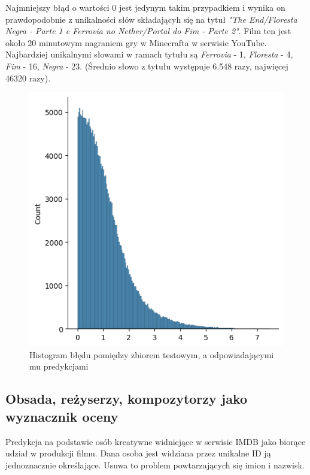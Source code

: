 \documentclass{article}
\begin{document}
{Najmniejszy błąd o wartości \( 0 \) jest jedynym takim przypadkiem i wynika on prawdopodobnie z unikalności słów składającyh się na tytuł \emph{"The End/Floresta Negra - Parte 1 e Ferrovia no Nether/Portal do Fim - Parte 2"}. Film ten jest około 20 minutowym nagraniem gry w Minecrafta w serwisie YouTube. Najbardziej unikalnymi słowami w ramach tytułu są \emph{Ferrovia} - 1, \emph{Floresta} - 4, \emph{Fim} - 16, \emph{Negra} - 23. (Średnio słowo z tytułu występuje 6.548 razy, najwięcej 46320 razy).

\begin{center}
\begin{figure}[h]
\caption{Histogram błędu pomiędzy zbiorem testowym, a odpowiadającymi mu predykcjami}
\includegraphics[scale=0.9]{titles.png}
\end{figure}
\end{center}

\pagebreak

\subsection{Obsada, reżyserzy, kompozytorzy jako wyznacznik oceny}

Predykcja na podstawie osób kreatywne widniejące w serwisie IMDB jako biorące udział w produkcji filmu. Dana osoba jest widziana przez unikalne ID ją jednoznacznie określające. Usuwa to problem powtarzających się imion i nazwisk.

}
\end{document}
